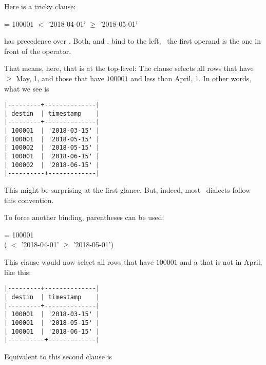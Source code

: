 Here is a tricky  clause:

  = 100001
  $<$ '2018-04-01'
  $\ge$ '2018-05-01'

 has precedence over .
Both,  and , bind to the left,
\ie\ the first operand is the one in front of the operator.

That means, here, that  is at the top-level:
The clause selects all rows that have 
$\ge$ May, 1, and those that have  $100001$
and  less than April, 1.
In other words, what we see is

\begin{minipage}{\textwidth}
\begin{verbatim}
|---------+--------------|
| destin  | timestamp    |
|---------+--------------|
| 100001  | '2018-03-15' |
| 100001  | '2018-05-15' |
| 100002  | '2018-05-15' |
| 100001  | '2018-06-15' |
| 100002  | '2018-06-15' |
|----------+-------------|
\end{verbatim}
\end{minipage}

This might be surprising at the first glance.
But, indeed, most \sql\ dialects follow this convention.

To force another binding, parentheses can be used:

\begin{minipage}{\textwidth}
  = 100001 \\
\hspace*{0.45cm} ( $<$ '2018-04-01'
  $\ge$ '2018-05-01')
\end{minipage}

This clause would now select all rows
that have  $100001$ and
a  that is not in April,
like this:

\begin{minipage}{\textwidth}
\begin{verbatim}
|---------+--------------|
| destin  | timestamp    |
|---------+--------------|
| 100001  | '2018-03-15' |
| 100001  | '2018-05-15' |
| 100001  | '2018-06-15' |
|----------+-------------|
\end{verbatim}
\end{minipage}

Equivalent to this second clause is

